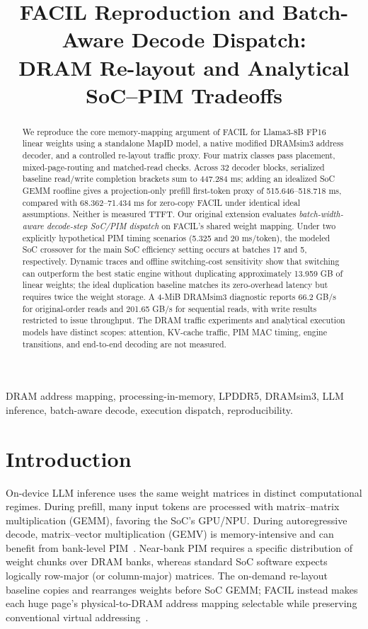 \documentclass[conference,10pt]{IEEEtran}
\title{FACIL Reproduction and Batch-Aware Decode Dispatch:\\
DRAM Re-layout and Analytical SoC--PIM Tradeoffs}
\author{\IEEEauthorblockN{Author 1 \quad and \quad Author 2}
\IEEEauthorblockA{Department of Computer Science and Engineering\\
Indian Institute of Technology Guwahati\\
\textit{Author names to be completed before submission}}
}
\newcommand{\facil}{FACIL}
\begin{document}
\maketitle
\begin{abstract}
We reproduce the core memory-mapping argument of FACIL for Llama3-8B
FP16 linear weights using a standalone MapID model, a native modified
DRAMsim3 address decoder, and a controlled re-layout traffic proxy.
Four matrix classes pass placement, mixed-page-routing and matched-read
checks. Across 32 decoder blocks, serialized baseline read/write
completion brackets sum to 447.284 ms; adding an idealized SoC GEMM
roofline gives a projection-only prefill first-token proxy of
515.646--518.718 ms, compared with 68.362--71.434 ms for zero-copy
FACIL under identical ideal assumptions. Neither is measured TTFT.
Our original extension evaluates \emph{batch-width-aware decode-step
SoC/PIM dispatch} on FACIL's shared weight mapping. Under two explicitly
hypothetical PIM timing scenarios (5.325 and 20 ms/token), the modeled
SoC crossover for the main SoC efficiency setting occurs at batches
17 and 5, respectively. Dynamic traces and offline switching-cost
sensitivity show that switching can outperform the best static engine
without duplicating approximately 13.959 GB of linear weights; the
ideal duplication baseline matches its zero-overhead latency but
requires twice the weight storage. A 4-MiB DRAMsim3 diagnostic reports
66.2 GB/s for original-order reads and 201.65 GB/s for sequential reads,
with write results restricted to issue throughput. The DRAM traffic experiments and analytical execution models have
distinct scopes: attention, KV-cache traffic, PIM MAC timing, engine
transitions, and end-to-end decoding are not measured.
\end{abstract}

\begin{IEEEkeywords}
DRAM address mapping, processing-in-memory, LPDDR5, DRAMsim3,
LLM inference, batch-aware decode, execution dispatch, reproducibility.
\end{IEEEkeywords}

\section{Introduction}
On-device LLM inference uses the same weight matrices in distinct
computational regimes. During prefill, many input tokens are processed
with matrix--matrix multiplication (GEMM), favoring the SoC's GPU/NPU.
During autoregressive decode, matrix--vector multiplication (GEMV) is
memory-intensive and can benefit from bank-level PIM~\cite{facil}.
Near-bank PIM requires a specific distribution of weight chunks over
DRAM banks, whereas standard SoC software expects logically row-major
(or column-major) matrices. The on-demand re-layout baseline copies and
rearranges weights before SoC GEMM; \facil{} instead makes each huge
page's physical-to-DRAM address mapping selectable while preserving
conventional virtual addressing~\cite{facil}.
\end{document}
